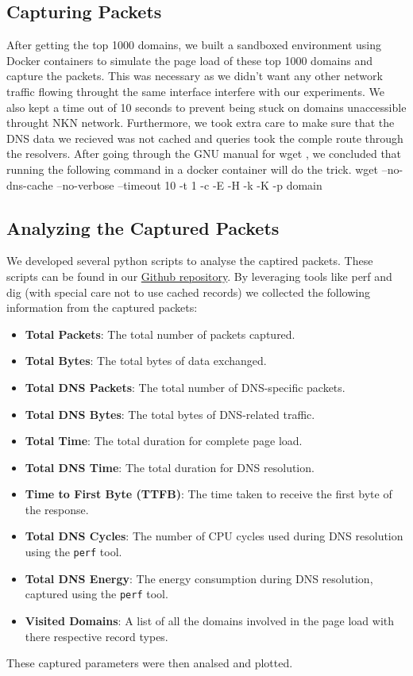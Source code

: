 \documentclass[conference]{IEEEtran}
\begin{document}
\subsection{Capturing Packets}
After getting the top 1000 domains, we built a sandboxed environment using Docker containers to simulate the page load of these top 1000 domains and capture the packets. This was necessary as we didn't want any other network traffic flowing throught the same interface interfere with our experiments. We also kept a time out of 10 seconds to prevent being stuck on domains unaccessible throught NKN network. Furthermore, we took extra care to make sure that the DNS data we recieved was not cached and queries took the comple route through the resolvers. After going through the GNU manual for wget \cite{wget}, we concluded that running the following command in a docker container will do the trick. wget --no-dns-cache --no-verbose --timeout 10 -t 1 -c -E -H -k -K -p domain

\subsection{Analyzing the Captured Packets}
We developed several python scripts to analyse the captired packets. These scripts can be found in our \href{https://github.com/SachinJalan/DNS-Renaissance}{Github repository}. By leveraging tools like perf and dig (with special care not to use cached records) we collected the following information from the captured packets:
\begin{itemize}
    \item \textbf{Total Packets}: The total number of packets captured.
    \item \textbf{Total Bytes}: The total bytes of data exchanged.
    \item \textbf{Total DNS Packets}: The total number of DNS-specific packets.
    \item \textbf{Total DNS Bytes}: The total bytes of DNS-related traffic.
    \item \textbf{Total Time}: The total duration for complete page load.
    \item \textbf{Total DNS Time}: The total duration for DNS resolution.
    \item \textbf{Time to First Byte (TTFB)}: The time taken to receive the first byte of the response.
    \item \textbf{Total DNS Cycles}: The number of CPU cycles used during DNS resolution using the \texttt{perf} tool.
    \item \textbf{Total DNS Energy}: The energy consumption during DNS resolution, captured using the \texttt{perf} tool.
    \item \textbf{Visited Domains}: A list of all the domains involved in the page load with there respective record types.
\end{itemize}
These captured parameters were then analsed and plotted.
\end{document}
